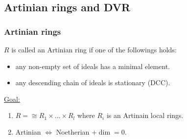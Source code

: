 \subsection{Artinian rings and DVR}
\subsubsection{Artinian rings}

\begin{definition}
  $R$ is called an Artinian ring if one of the followings holds:
  \begin{itemize}
    \item any non-empty set of ideals has a minimal element.
    \item any descending chain of ideals is stationary (DCC).
  \end{itemize}
\end{definition}

\underline{Goal:}
\begin{enumerate}
  \item $R = \cong R_1 \times \dots \times R_l$ where $R_i$ is an Artinain
    local rings.
  \item Artinian $\iff$ Noetherian $+ \dim = 0$.
\end{enumerate}

